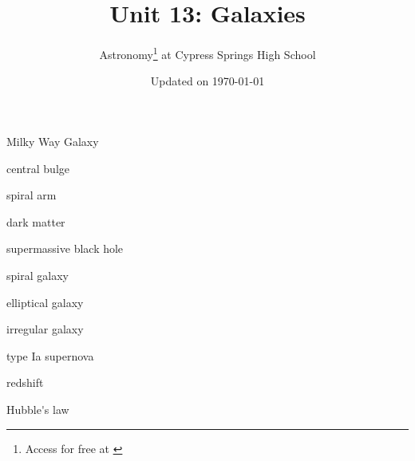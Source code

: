 \documentclass{article}
\title{Unit 13: Galaxies}
\author{Astronomy\footnote{Access for free at \href{\openstax}{\openstax}} \hspace{0.1ex} at Cypress Springs High School}
\date{Updated on \today}
\numberwithin{equation}{section}
\numberwithin{figure}{section}
\begin{document}
\maketitle

\gls{Milky Way Galaxy}

\gls{central bulge}

\gls{spiral arm}

\gls{dark matter}

\gls{supermassive black hole}

\gls{spiral galaxy}

\gls{elliptical galaxy}

\gls{irregular galaxy}

\gls{type Ia supernova}

\gls{redshift}

\gls{Hubble's law}
\end{document}
